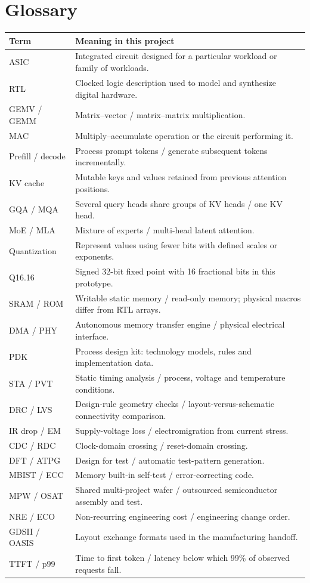 \documentclass[11pt,a4paper]{article}
\newcommand{\phase}[2]{\clearpage\section{#1}\label{#2}}
\begin{document}
\phase{Glossary}{sec:glossary}
\begin{tabularx}{\linewidth}{@{}p{32mm}Y@{}}
\toprule\textbf{Term} & \textbf{Meaning in this project}\\\midrule
ASIC & Integrated circuit designed for a particular workload or family of workloads.\\
RTL & Clocked logic description used to model and synthesize digital hardware.\\
GEMV / GEMM & Matrix--vector / matrix--matrix multiplication.\\
MAC & Multiply--accumulate operation or the circuit performing it.\\
Prefill / decode & Process prompt tokens / generate subsequent tokens incrementally.\\
KV cache & Mutable keys and values retained from previous attention positions.\\
GQA / MQA & Several query heads share groups of KV heads / one KV head.\\
MoE / MLA & Mixture of experts / multi-head latent attention.\\
Quantization & Represent values using fewer bits with defined scales or exponents.\\
Q16.16 & Signed 32-bit fixed point with 16 fractional bits in this prototype.\\
SRAM / ROM & Writable static memory / read-only memory; physical macros differ from RTL arrays.\\
DMA / PHY & Autonomous memory transfer engine / physical electrical interface.\\
PDK & Process design kit: technology models, rules and implementation data.\\
STA / PVT & Static timing analysis / process, voltage and temperature conditions.\\
DRC / LVS & Design-rule geometry checks / layout-versus-schematic connectivity comparison.\\
IR drop / EM & Supply-voltage loss / electromigration from current stress.\\
CDC / RDC & Clock-domain crossing / reset-domain crossing.\\
DFT / ATPG & Design for test / automatic test-pattern generation.\\
MBIST / ECC & Memory built-in self-test / error-correcting code.\\
MPW / OSAT & Shared multi-project wafer / outsourced semiconductor assembly and test.\\
NRE / ECO & Non-recurring engineering cost / engineering change order.\\
GDSII / OASIS & Layout exchange formats used in the manufacturing handoff.\\
TTFT / p99 & Time to first token / latency below which 99\% of observed requests fall.\\\bottomrule
\end{tabularx}
\end{document}
